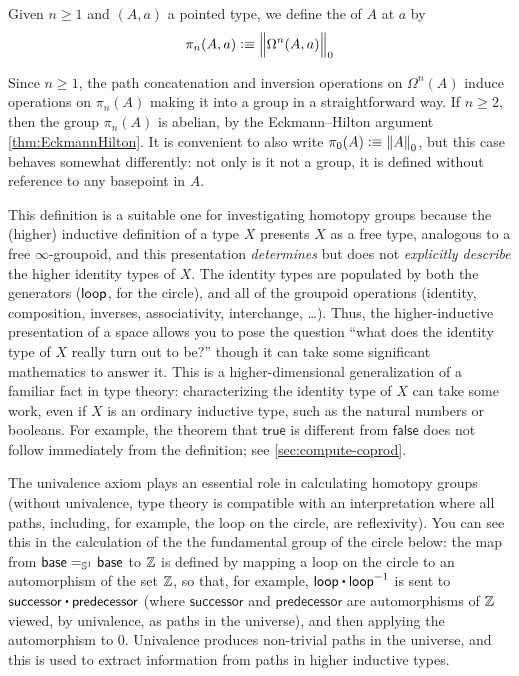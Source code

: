 \begin{defn}\label{def-of-homotopy-groups}
  Given $n\ge 1$ and $(A,a)$ a pointed type, we define the  of $A$
  at $a$ by
  \[\pi_n(A,a)\defeq \Trunc0{\Omega^n(A,a)}\]
\end{defn}

\noindent
Since $n\ge 1$, the path concatenation and inversion operations on
$\Omega^n(A)$ induce operations on $\pi_n(A)$ making it into a group in
a straightforward way.  If $n\ge 2$, then the group $\pi_n(A)$ is
abelian, by the Eckmann--Hilton argument \autoref{thm:EckmannHilton}.
It is convenient to also write $\pi_0(A) \defeq \trunc0 A$,
but this case behaves somewhat differently: not only is it not a group,
it is defined without reference to any basepoint in $A$.

%
This definition is a suitable one for investigating homotopy groups
because the (higher) inductive definition of a type $X$ presents $X$ as
a free type, analogous to a free $\infty$-groupoid,
%
and this
presentation \emph{determines} but does not \emph{explicitly describe}
the higher identity types of $X$.  The identity types are populated by
both the generators ($\lloop$, for the circle), and all of the groupoid
operations (identity, composition, inverses, associativity, interchange,
\ldots).  Thus, the higher-inductive presentation of a space allows you
to pose the question ``what does the identity type of $X$ really turn out
to be?'' though it can take some significant mathematics to answer it.
This is a higher-dimensional generalization of a familiar fact in type
theory: characterizing the identity type of $X$ can take some work,
even if $X$ is an ordinary inductive type, such as the natural numbers
or booleans.  For example, the theorem that $\mathsf{true}$ is different
from $\mathsf{false}$ does not follow immediately from the definition;
see \autoref{sec:compute-coprod}.

%
The univalence axiom plays an essential role in calculating homotopy
groups (without univalence, type theory is compatible with an
interpretation where all paths, including, for example, the loop on the
circle, are reflexivity).  You can see this in the calculation of the
the fundamental group of the circle below: the map from $\id[\Sn ^1]
\base \base$ to $\Z$ is defined by mapping a loop on the circle to an
automorphism of the set $\Z$, so that, for example, $\lloop \ct \opp
\lloop$ is sent to $\mathsf{successor} \ct \mathsf{predecessor}$ (where
$\mathsf{successor}$ and $\mathsf{predecessor}$ are automorphisms of
$\Z$ viewed, by univalence, as paths in the universe), and then applying
the automorphism to 0. Univalence produces non-trivial paths in the
universe, and this is used to extract information from paths in higher
inductive types.

